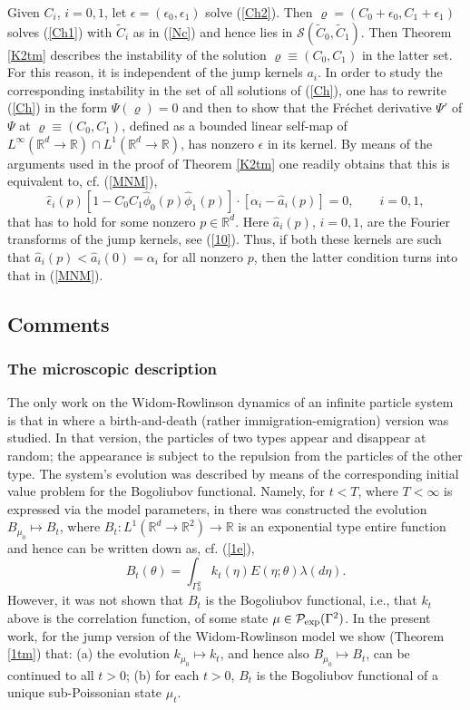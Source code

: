 \documentclass[reqno,11pt]{amsart}
\theoremstyle{definition}
\theoremstyle{remark}
\numberwithin{equation}{section}
\begin{document}
Given $C_i$, $i=0,1$, let $\epsilon =(\epsilon_0, \epsilon_1)$ solve
(\ref{Ch2}). Then $\varrho = (C_0+\epsilon_0, C_1+ \epsilon_1)$
solves (\ref{Ch1}) with $\widetilde{C}_i$ as in (\ref{Nc}) and hence
lies in $\mathcal{S}(\widetilde{C}_0, \widetilde{C}_1)$. Then
Theorem \ref{K2tm} describes the instability of the solution
$\varrho \equiv (C_0, C_1)$ in the latter set. For this reason, it
is independent of the jump kernels $a_i$. In order to study the
corresponding instability in the set of all solutions of (\ref{Ch}),
one has to rewrite (\ref{Ch}) in the form $\Psi(\varrho)=0$ and then
to show that the Fr{\'e}chet derivative $\Psi'$ of $\Psi$ at
$\varrho \equiv (C_0, C_1)$, defined as a bounded linear self-map of
$L^\infty (\mathds{R}^d\to \mathds{R})\cap  L^1 (\mathds{R}^d\to
\mathds{R})$, has nonzero $\epsilon$ in its kernel. By means of the
arguments used in the proof of Theorem \ref{K2tm} one readily
obtains that this is equivalent to, cf. (\ref{MNM}),
\[
\hat{\epsilon}_i (p) \left[1 - C_0 C_1 \hat{\phi}_0 (p) \hat{\phi}_1
(p)\right] \cdot \left[ \alpha_i - \hat{a}_i(p) \right] =0 , \qquad
i=0,1,
\]
that has to hold for some nonzero $p\in \mathds{R}^d$. Here
$\hat{a}_i(p)$, $i=0,1$, are the Fourier transforms of the jump
kernels, see (\ref{10}). Thus, if both these kernels are such that
$\hat{a}_i(p) < \hat{a}_i(0) = \alpha_i$ for all nonzero $p$, then
the latter condition turns into that in (\ref{MNM}).

\subsection{Comments}

\subsubsection{The microscopic description}
The only work on the Widom-Rowlinson dynamics of an infinite
particle system is that in \cite{FKKO} where a birth-and-death
(rather immigration-emigration) version was studied. In that
version, the particles of two types appear and disappear at random;
the appearance is subject to the repulsion from the particles of the
other type. The system's evolution was described by means of the
corresponding initial value problem for the Bogoliubov functional.
Namely, for $t< T$, where $T<\infty$ is expressed via the model
parameters, in \cite[Theorem 1]{FKKO} there was constructed the
evolution $B_{\mu_0} \mapsto B_t$, where $B_t: L^1(\mathds{R}^d \to
\mathds{R}^2)\to \mathds{R}$ is an exponential type entire function
and hence can be written down as, cf. (\ref{1e}),
\[
B_t (\theta) = \int_{\Gamma_0^2} k_t (\eta)E(\eta;\theta) \lambda (
d \eta).
\]
However, it was not shown that $B_t$ is the Bogoliubov functional,
i.e., that $k_t$ above is the correlation function, of some state
$\mu\in \mathcal{P}_{\rm exp} (\Gamma^2)$. In  the present work, for
the jump version of the Widom-Rowlinson model we show (Theorem
\ref{1tm}) that: (a) the evolution $k_{\mu_0} \mapsto k_t$, and
hence also $B_{\mu_0} \mapsto B_t$, can be continued to all $t>0$;
(b) for each $t>0$, $ B_t$ is the Bogoliubov functional of a unique
sub-Poissonian state $\mu_t$.
\end{document}
